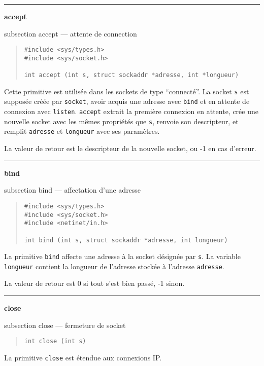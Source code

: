 \documentclass [twoside] {report}
\newcommand {\primitive} [1]
    {
	{\large \bf #1}
	\addcontentsline {toc} {subsection} {#1}
    }
\newcommand {\separation}
    {
	\vspace {7mm}
	\nopagebreak
	\hrule
    }
\begin{document}

\separation
\primitive {accept} --- attente de connection

\begin {quote}
\begin {verbatim}
#include <sys/types.h>
#include <sys/socket.h>

int accept (int s, struct sockaddr *adresse, int *longueur)
\end{verbatim}
\end {quote}

Cette primitive est utilisée dans les sockets
de type ``connecté''. La socket {\tt s} est supposée créée
par {\tt socket}, avoir acquis une adresse avec {\tt bind}
et en attente de connexion avec {\tt listen}. {\tt accept}
extrait la première connexion en attente, crée une nouvelle
socket avec les mêmes propriétés que {\tt s}, renvoie son
descripteur, et remplit {\tt adresse} et {\tt longueur}
avec ses paramètres.

La valeur de retour est le descripteur de la nouvelle
socket, ou -1 en cas d'erreur.



\separation
\primitive {bind} --- affectation d'une adresse

\begin {quote}
\begin {verbatim}
#include <sys/types.h>
#include <sys/socket.h>
#include <netinet/in.h>

int bind (int s, struct sockaddr *adresse, int longueur)
\end{verbatim}
\end {quote}

La primitive {\tt bind} affecte une adresse à la socket
désignée par {\tt s}. La variable {\tt longueur} contient la
longueur de l'adresse stockée à l'adresse {\tt adresse}.

La valeur de retour est 0 si tout s'est bien passé, -1
sinon.



\separation
\primitive {close} --- fermeture de socket

\begin {quote}
\begin {verbatim}
int close (int s)
\end{verbatim}
\end {quote}

La primitive {\tt close} est étendue aux connexions IP.
\end{document}
